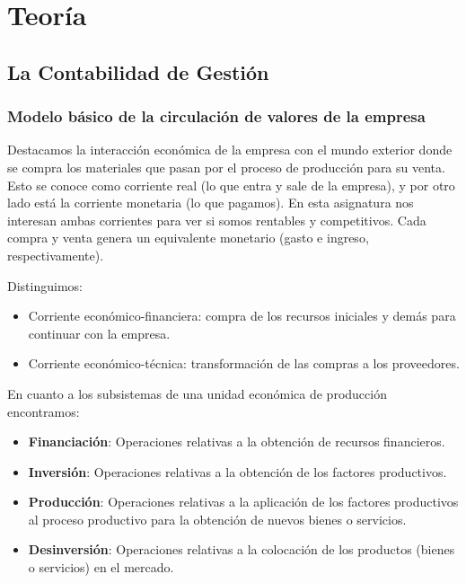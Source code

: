 \documentclass[12pt]{report} %
\providecommand{\tightlist}{%
  \setlength{\itemsep}{0pt}\setlength{\parskip}{0pt}}
\begin{document}
\part{Teoría}

\hypertarget{la-contabilidad-de-gestiuxf3n}{%
\chapter{La Contabilidad de
Gestión}\label{la-contabilidad-de-gestiuxf3n}}

\hypertarget{modelo-buxe1sico-de-la-circulaciuxf3n-de-valores-de-la-empresa}{%
\section{Modelo básico de la circulación de valores de la
empresa}\label{modelo-buxe1sico-de-la-circulaciuxf3n-de-valores-de-la-empresa}}

Destacamos la interacción económica de la empresa con el mundo exterior
donde se compra los materiales que pasan por el proceso de producción
para su venta. Esto se conoce como corriente real (lo que entra y sale
de la empresa), y por otro lado está la corriente monetaria (lo que
pagamos). En esta asignatura nos interesan ambas corrientes para ver si
somos rentables y competitivos. Cada compra y venta genera un
equivalente monetario (gasto e ingreso, respectivamente).

Distinguimos:

\begin{itemize}
\tightlist
\item
  Corriente económico-financiera: compra de los recursos iniciales y
  demás para continuar con la empresa.
\item
  Corriente económico-técnica: transformación de las compras a los
  proveedores.
\end{itemize}

En cuanto a los subsistemas de una unidad económica de producción
encontramos:

\begin{itemize}
\tightlist
\item
  \textbf{Financiación}: Operaciones relativas a la obtención de
  recursos financieros.
\item
  \textbf{Inversión}: Operaciones relativas a la obtención de los
  factores productivos.
\item
  \textbf{Producción}: Operaciones relativas a la aplicación de los
  factores productivos al proceso productivo para la obtención de nuevos
  bienes o servicios.
\item
  \textbf{Desinversión}: Operaciones relativas a la colocación de los
  productos (bienes o servicios) en el mercado.
\end{itemize}
\end{document}

